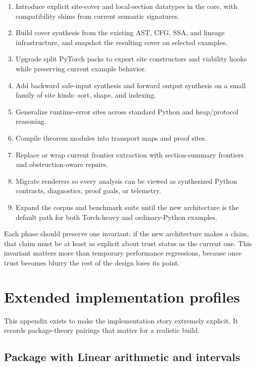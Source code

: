 \documentclass[11pt]{report}
\DeclareRobustCommand{\py}[1]{\texttt{\detokenize{#1}}}
\theoremstyle{definition}
\theoremstyle{plain}
\begin{document}
\begin{enumerate}[label=\textbf{Phase \arabic*:}]
  \item Introduce explicit site-cover and local-section datatypes in the core,
  with compatibility shims from current semantic signatures.
  \item Build cover synthesis from the existing AST, CFG, SSA, and lineage
  infrastructure, and snapshot the resulting cover on selected examples.
  \item Upgrade split PyTorch packs to export site constructors and viability
  hooks while preserving current example behavior.
  \item Add backward safe-input synthesis and forward output synthesis on a small
  family of site kinds: sort, shape, and indexing.
  \item Generalize runtime-error sites across standard Python and heap/protocol
  reasoning.
  \item Compile theorem modules into transport maps and proof sites.
  \item Replace or wrap current frontier extraction with section-summary
  frontiers and obstruction-aware repairs.
  \item Migrate renderers so every analysis can be viewed as synthesized Python
  contracts, diagnostics, proof goals, or telemetry.
  \item Expand the corpus and benchmark suite until the new architecture is the
  default path for both Torch-heavy and ordinary-Python examples.
\end{enumerate}

Each phase should preserve one invariant: if the new architecture makes a claim,
that claim must be at least as explicit about trust status as the current one.
This invariant matters more than temporary performance regressions, because once
trust becomes blurry the rest of the design loses its point.


\section{Extended implementation profiles}

This appendix exists to make the implementation story extremely explicit. It records package-theory pairings that matter for a realistic build.


\subsection{Package \py{src/deppy/assist} with Linear arithmetic and intervals}
\end{document}
